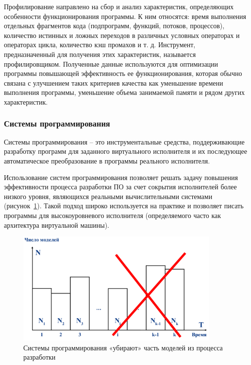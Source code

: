 Профилирование направлено на сбор и анализ характеристик, определяющих особенности функционирования программы. К ним относятся: время выполнения отдельных фрагментов кода (подпрограмм, функций, потоков, процессов), количество истинных и ложных переходов в различных условных операторах и операторах цикла, количество кэш промахов и т. д. Инструмент, предназначенный для получения этих характеристик, называется профилировщиком. Полученные данные используются для оптимизации программы повышающей эффективность ее функционирования, которая обычно связана с улучшением таких критериев качества как уменьшение времени выполнения программы, уменьшение объема занимаемой памяти и рядом других характеристик.

\subsubsection{Системы программирования}

Системы программирования – это инструментальные средства, поддерживающие разработку программ для заданного виртуального исполнителя и их последующее автоматическое преобразование в программы реального исполнителя.

Использование систем программирования позволяет решать задачу повышения эффективности процесса разработки ПО за счет сокрытия исполнителей более низкого уровня, являющихся реальными вычислительными системами (рисунок~\ref{fdiag05}). Такой подход широко используется на практике и позволяет писать программы для высокоуровневого исполнителя (определяемого часто как архитектура виртуальной машины).

\begin{figure}[htbp]
    \centering
    \includegraphics[width=0.9\textwidth]{img/fdiag05.png}
    \caption{Системы программирования «убирают» часть моделей из процесса разработки}
    \label{fdiag05}
\end{figure}


